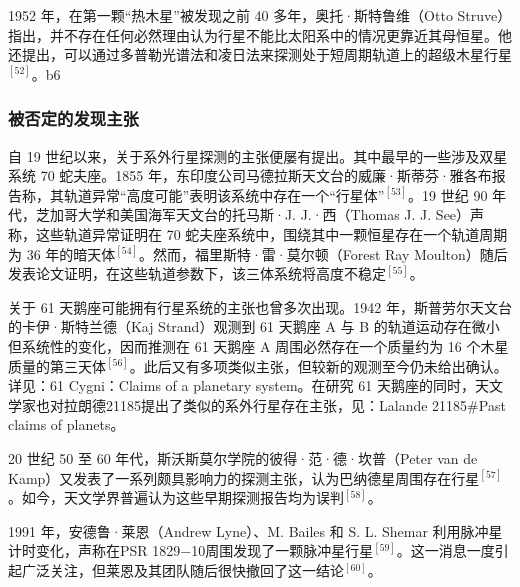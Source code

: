 1952 年，在第一颗“热木星”被发现之前 40 多年，奥托·斯特鲁维（Otto Struve）指出，并不存在任何必然理由认为行星不能比太阳系中的情况更靠近其母恒星。他还提出，可以通过多普勒光谱法和凌日法来探测处于短周期轨道上的超级木星行星$^{[52]}$。b6
\subsubsection{被否定的发现主张}
自 19 世纪以来，关于系外行星探测的主张便屡有提出。其中最早的一些涉及双星系统 70 蛇夫座。1855 年，东印度公司马德拉斯天文台的威廉·斯蒂芬·雅各布报告称，其轨道异常“高度可能”表明该系统中存在一个“行星体”$^{[53]}$。19 世纪 90 年代，芝加哥大学和美国海军天文台的托马斯·J. J.·西（Thomas J. J. See）声称，这些轨道异常证明在 70 蛇夫座系统中，围绕其中一颗恒星存在一个轨道周期为 36 年的暗天体$^{[54]}$。然而，福里斯特·雷·莫尔顿（Forest Ray Moulton）随后发表论文证明，在这些轨道参数下，该三体系统将高度不稳定$^{[55]}$。

关于 61 天鹅座可能拥有行星系统的主张也曾多次出现。1942 年，斯普劳尔天文台的卡伊·斯特兰德（Kaj Strand）观测到 61 天鹅座 A 与 B 的轨道运动存在微小但系统性的变化，因而推测在 61 天鹅座 A 周围必然存在一个质量约为 16 个木星质量的第三天体$^{[56]}$。此后又有多项类似主张，但较新的观测至今仍未给出确认。详见：61 Cygni：Claims of a planetary system。在研究 61 天鹅座的同时，天文学家也对拉朗德21185提出了类似的系外行星存在主张，见：Lalande 21185#Past claims of planets。

20 世纪 50 至 60 年代，斯沃斯莫尔学院的彼得·范·德·坎普（Peter van de Kamp）又发表了一系列颇具影响力的探测主张，认为巴纳德星周围存在行星$^{[57]}$。如今，天文学界普遍认为这些早期探测报告均为误判$^{[58]}$。

1991 年，安德鲁·莱恩（Andrew Lyne）、M. Bailes 和 S. L. Shemar 利用脉冲星计时变化，声称在PSR 1829−10周围发现了一颗脉冲星行星$^{[59]}$。这一消息一度引起广泛关注，但莱恩及其团队随后很快撤回了这一结论$^{[60]}$。
